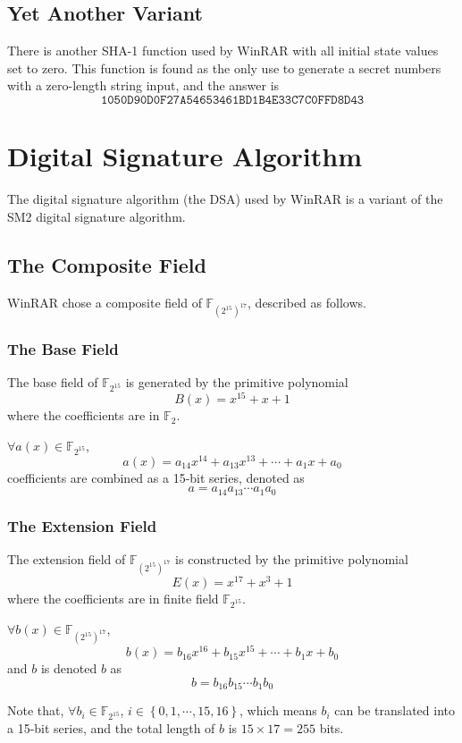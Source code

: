 \documentclass[oneside]{article}
\begin{document}
\subsection{Yet Another Variant}\label{YA-SHA-1}
There is another SHA-1 function used by WinRAR with all initial state values set to zero.
This function is found as the only use to generate a secret numbers with a zero-length string input, and the answer is
\[\mathtt{1050D90D0F27A54653461BD1B4E33C7C0FFD8D43}\]

\section{Digital Signature Algorithm}
The digital signature algorithm (the DSA) used by WinRAR is a variant of the SM2 digital signature algorithm.

\subsection{The Composite Field}
WinRAR chose a composite field of $\mathbb{F}_{\left(2^{15}\right)^{17}}$, described as follows.

\subsubsection{The Base Field}
The base field of $\mathbb{F}_{2^{15}}$ is generated by the primitive polynomial
\[B\left(x\right)=x^{15}+x+1\]
where the coefficients are in $\mathbb{F}_{2}$.

$\forall a\left(x\right)\in\mathbb{F}_{2^{15}}$,
\[a\left(x\right)=a_{14}x^{14}+a_{13}x^{13}+\cdots+a_1x+a_0\]
coefficients are combined as a 15-bit series, denoted as
\[a=a_{14}a_{13}\cdots a_1a_0\]

\subsubsection{The Extension Field}
The extension field of $\mathbb{F}_{\left(2^{15}\right)^{17}}$ is constructed by the primitive polynomial
\[E\left(x\right)=x^{17}+x^3+1\]
where the coefficients are in finite field $\mathbb{F}_{2^{15}}$.

$\forall b\left(x\right)\in\mathbb{F}_{\left(2^{15}\right)^{17}}$,
\[b\left(x\right)=b_{16}x^{16}+b_{15}x^{15}+\cdots+b_1x+b_0\]
and $b$ is denoted $b$ as
\[b=b_{16}b_{15}\cdots b_1b_0\]

Note that, $\forall b_i\in\mathbb{F}_{2^{15}}$, $i\in\left\{0,1,\cdots,15,16\right\}$, which means $b_i$ can be translated into a 15-bit series, and the total length of $b$ is $15\times 17=255$ bits.
\end{document}
